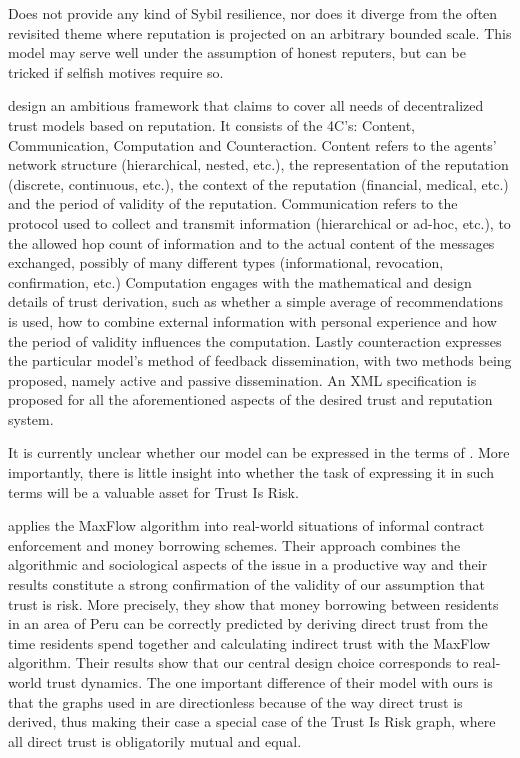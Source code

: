   \cite{openrep} Does not provide any kind of Sybil resilience, nor does it diverge from the often revisited theme where
  reputation is projected on an arbitrary bounded scale. This model may serve well under the assumption of honest reputers,
  but can be tricked if selfish motives require so.

  \cite{sdt} design an ambitious framework that claims to cover all needs of decentralized trust models based on reputation.
  It consists of the 4C's: Content, Communication, Computation and Counteraction. Content refers to the agents' network
  structure (hierarchical, nested, etc.), the representation of the reputation (discrete, continuous, etc.), the context of
  the reputation (financial, medical, etc.) and the period of validity of the reputation. Communication refers to the
  protocol used to collect and transmit information (hierarchical or ad-hoc, etc.), to the allowed hop count of information
  and to the actual content of the messages exchanged, possibly of many different types (informational, revocation,
  confirmation, etc.) Computation engages with the mathematical and design details of trust derivation, such as whether a
  simple average of recommendations is used, how to combine external information with personal experience and how the period
  of validity influences the computation. Lastly counteraction expresses the particular model's method of feedback
  dissemination, with two methods being proposed, namely active and passive dissemination. An XML specification is proposed
  for all the aforementioned aspects of the desired trust and reputation system.

  It is currently unclear whether our model can be expressed in the terms of \cite{sdt}. More importantly, there is little
  insight into whether the task of expressing it in such terms will be a valuable asset for Trust Is Risk.

  \cite{kmrs} applies the MaxFlow algorithm into real-world situations of informal contract enforcement and money borrowing
  schemes. Their approach combines the algorithmic and sociological aspects of the issue in a productive way and their
  results constitute a strong confirmation of the validity of our assumption that trust is risk. More precisely, they show
  that money borrowing between residents in an area of Peru can be correctly predicted by deriving direct trust from the time
  residents spend together and calculating indirect trust with the MaxFlow algorithm. Their results show that our central
  design choice corresponds to real-world trust dynamics. The one important difference of their model with ours is that
  the graphs used in \cite{kmrs} are directionless because of the way direct trust is derived, thus making their case a
  special case of the Trust Is Risk graph, where all direct trust is obligatorily mutual and equal.

